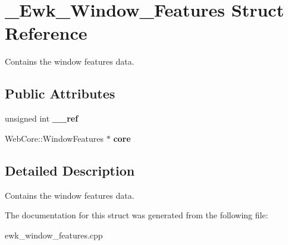 \hypertarget{struct__Ewk__Window__Features}{\section{\+\_\+\+Ewk\+\_\+\+Window\+\_\+\+Features Struct Reference}
\label{struct__Ewk__Window__Features}
}


Contains the window features data.  


\subsection*{Public Attributes}
\begin{DoxyCompactItemize}
\item 
\hypertarget{struct__Ewk__Window__Features_a11c1ba3be4f81f04533000ba55097482}{unsigned int {\bfseries \+\_\+\+\_\+ref}}\label{struct__Ewk__Window__Features_a11c1ba3be4f81f04533000ba55097482}

\item 
\hypertarget{struct__Ewk__Window__Features_a7ad6e1b3d11d50b70983cb0607794ddc}{Web\+Core\+::\+Window\+Features $\ast$ {\bfseries core}}\label{struct__Ewk__Window__Features_a7ad6e1b3d11d50b70983cb0607794ddc}

\end{DoxyCompactItemize}


\subsection{Detailed Description}
Contains the window features data. 

The documentation for this struct was generated from the following file\+:\begin{DoxyCompactItemize}
\item 
ewk\+\_\+window\+\_\+features.\+cpp\end{DoxyCompactItemize}

